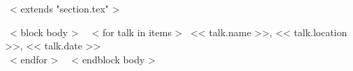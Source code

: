 ~< extends "section.tex" >~

~< block body >~
  ~< for talk in items >~
    << talk.name >>, << talk.location >>, << talk.date >> \\
  ~< endfor >~
\vspace{-.15in}
~< endblock body >~
